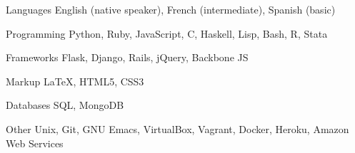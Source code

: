 \begin{cvskills}
  
  \cvskill
    {Languages}
    {English (native speaker), French (intermediate), Spanish (basic)}
  
  \cvskill
    {Programming}
    {Python, Ruby, JavaScript, C, Haskell, Lisp, Bash, R, Stata}
    
  \cvskill
    {Frameworks}
    {Flask, Django, Rails, jQuery, Backbone JS}
  
  \cvskill
    {Markup}
    {\LaTeX, HTML5, CSS3}
    
  \cvskill
    {Databases}
    {SQL, MongoDB}
    
  \cvskill
    {Other}
    {Unix, Git, GNU Emacs, VirtualBox, Vagrant, Docker, Heroku, Amazon Web Services}
  
  
\end{cvskills}


